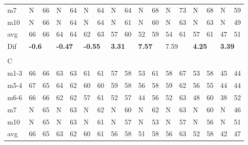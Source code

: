 \begin{table}[H]
\begin{tabular}{l|l|l|l|l|l|l|l|l|l|l|l|l|l|l|l|l}
m7   &    N  &      66   &   N  &   64     &   N        &     64      &    N    &     64       &      N      &       68     &      N      &       73     &        N   &       68     & N &  59\\
m10  &   N  &     66    &   N    &   64    &     N      &     64      &    N     &     61       &    N     &       60     &      N     &       63     &        N   &       63     & N & 49 \\ \hline
avg       &      66 &   66     &      64    &  64     &    62         &     63       &      57      &   60    &     52       &    59        &    54        &      61      &      57      &     61       & 47 &51 \\ \hline
Dif & \multicolumn{2}{l|}{\textbf{-0.6}} & \multicolumn{2}{l|}{\textbf{-0.47}} & \multicolumn{2}{l|}{\textbf{-0.55}} & \multicolumn{2}{l|}{\textbf{3.31}} & \multicolumn{2}{l|}{\textbf{7.57}} & \multicolumn{2}{l|}{7.59}& \multicolumn{2}{l|}{\textbf{4.25}}& \multicolumn{2}{l}{\textbf{3.39}} \\
\multicolumn{17}{l}{ } \\   
C & \multicolumn{2}{l|}{} & \multicolumn{2}{l|}{} & \multicolumn{2}{l|}{} & \multicolumn{2}{l|}{} & \multicolumn{2}{l|}{} & \multicolumn{2}{l|}{}& \multicolumn{2}{l|}{}& \multicolumn{2}{l}{}     \\ \hline
m1-3   &   66  &      66      &    63  &   63         &   61   &     61       &  57   &      58      &  53   &  61   &  58   &      67      &   53   &      58      & 45 &44  \\
m5-4   &    67  &      65      &   64  &     62       &   60    &     60       &  59  &      58      &  56  &  58   &   59  &        62    &   56  &      55      & 44 &44  \\
m6-6   &    66   &     66       &  62  &     62       &    57   &      61      &  52   &       57     &   44  & 56   &   52   &      63      &   48 &       60     & 38 & 52 \\
m7   &   N    &     65       &  N  &    63        & N   &      62      &  N   &      60      & N & 62   &   N   &      63      &   N   &    60        & N & 46 \\
m10  &  N   &      65      &   N  &    63        &  N  &      61      &   N  &       57    &  N  &  53 &  N   &     57       &   N  &      56      & N &  51\\ \hline
avg      &   66    &      65      &     63   &     62      &      60&   61      &       56  &     58       &   51   &  58     &  56     &   63         &      52      &    58        & 42 &47 \\ \hline

\end{tabular}
\end{table}
